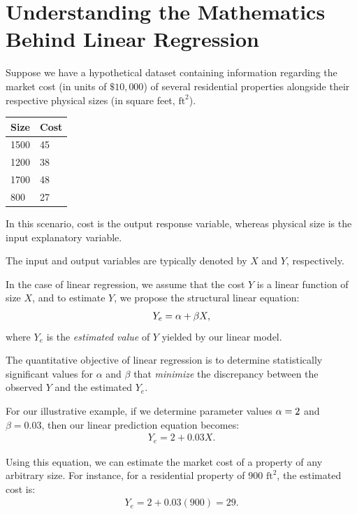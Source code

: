 \section{Understanding the Mathematics Behind Linear Regression}

Suppose we have a hypothetical dataset containing information regarding the market cost (in units of $\$10,000$) of several residential properties alongside their respective physical sizes (in square feet, $\text{ft}^2$).

\begin{center}
	\begin{tabular}{|l|l|}\hline
		Size & Cost\\\hline
		1500 & 45\\\hline
		1200 & 38\\\hline
		1700 & 48\\\hline
		800 & 27\\\hline
	\end{tabular}
\end{center}

In this scenario, cost is the output response variable, whereas physical size is the input explanatory variable.

The input and output variables are typically denoted by $X$ and $Y$, respectively.

In the case of linear regression, we assume that the cost $Y$ is a linear function of size $X$, and to estimate $Y$, we propose the structural linear equation:
\begin{align}
	Y_e = \alpha + \beta X,
\end{align}
where $Y_e$ is the \emph{estimated value} of $Y$ yielded by our linear model.

\begin{observacion}
	The quantitative objective of linear regression is to determine statistically significant values for $\alpha$ and $\beta$ that \emph{minimize} the discrepancy between the observed $Y$ and the estimated $Y_e$.
\end{observacion}

For our illustrative example, if we determine parameter values $\alpha = 2$ and $\beta = 0.03$, then our linear prediction equation becomes:
\begin{align}
	Y_e = 2 + 0.03 X.
\end{align}

Using this equation, we can estimate the market cost of a property of any arbitrary size. For instance, for a residential property of $900\text{ ft}^2$, the estimated cost is:
\begin{align}
	Y_e = 2 + 0.03(900) = 29.
\end{align}

